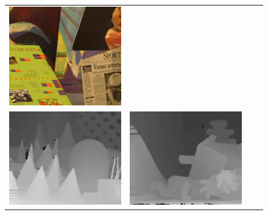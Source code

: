 \documentclass{article}
\begin{document}
\begin{figure}[h]
\begin{center}
\begin{tabular}{cccc}
\includegraphics[scale=0.225]{Images/venus.png}\\
\includegraphics[scale=0.23]{Images/theorical_results/cones.png} &
\includegraphics[scale=0.23]{Images/theorical_results/teddy.png} &

\end{tabular}
\end{center}
\end{figure}
\end{document}
